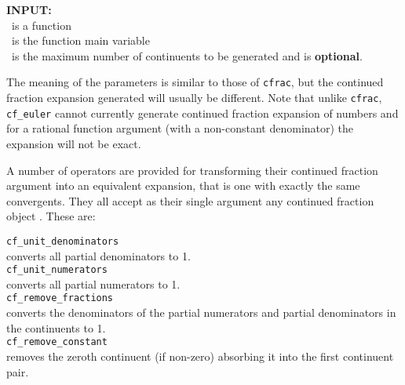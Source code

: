 \textbf{INPUT:}\\
\ is a function\\
 \ is the function main variable\\
 \ is the maximum number of continuents to be generated
and is \textbf{optional}.

The meaning of the parameters is similar to those of \texttt{cfrac}, but the
continued fraction expansion generated will usually be different. Note that
unlike \texttt{cfrac}, \texttt{cf\_euler} cannot currently generate
continued fraction expansion of numbers and for a rational function argument
(with a non-constant denominator) the expansion will not be exact.

\hypertarget{operator:CF_UNIT_NUMERATORS}{}
\hypertarget{operator:CF_UNIT_DENOMINATORS}{}
\hypertarget{operator:CF_REMOVE_FRACTIONS}{}
\hypertarget{operator:CF_REMOVE_CONSTANT}{}
A number of operators are provided for transforming their continued
fraction argument  into an equivalent expansion,
that is one with exactly the same convergents.
They all accept as their single argument any continued fraction
object .
These are:

\texttt{cf\_unit\_denominators}\\
converts all partial denominators to 1.\\[\baselineskip]
\texttt{cf\_unit\_numerators}\\
converts all partial numerators to 1.\\[\baselineskip]
\texttt{cf\_remove\_fractions}\\
converts the denominators of the partial numerators and partial
denominators in the continuents to 1.\\[\baselineskip]
\texttt{cf\_remove\_constant}\\
removes the zeroth continuent (if non-zero) absorbing it into the
first continuent pair.

